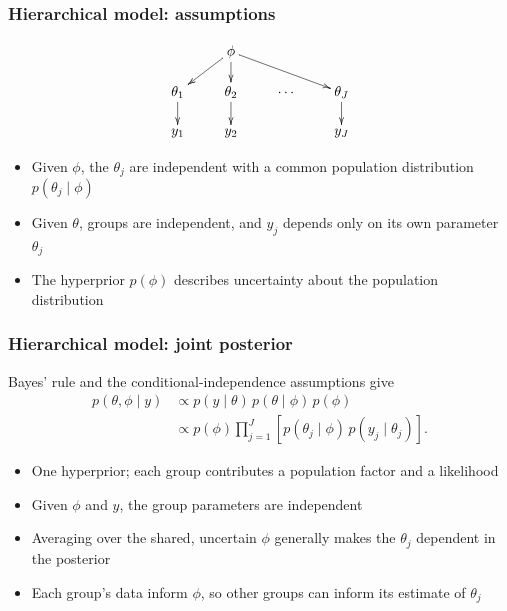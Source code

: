 \documentclass[10pt]{beamer}
\begin{document}
\begin{frame}
\frametitle{Hierarchical model: assumptions}

  \[
    \begin{xy}
      \xymatrix@R=5mm@C=8mm{
        & \phi \ar[dl] \ar[d] \ar[drr] & & \\
        \theta_1\ar[d] & \theta_2\ar[d] & \cdots & \theta_J\ar[d] \\
        y_1 & y_2 & & y_J
      }
    \end{xy}
  \]
  \begin{itemize}
  \item Given $\phi$, the $\theta_j$ are independent with a common
    population distribution $p(\theta_j\mid\phi)$
  \item<2-> Given $\theta$, groups are independent, and $y_j$
    depends only on its own parameter $\theta_j$
  \item<2-> The hyperprior $p(\phi)$ describes uncertainty about
    the population distribution
  \end{itemize}
\end{frame}

\begin{frame}
\frametitle{Hierarchical model: joint posterior}

  Bayes' rule and the conditional-independence assumptions give
  \begin{align*}
    p(\theta,\phi\mid y)
      &\propto p(y\mid\theta)\,p(\theta\mid\phi)\,p(\phi)\\
      &\propto p(\phi)\prod_{j=1}^J
        \left[p(\theta_j\mid\phi)\,p(y_j\mid\theta_j)\right].
  \end{align*}
  \begin{itemize}
  \item One hyperprior; each group contributes a population factor
    and a likelihood
  \item<2-> Given $\phi$ and $y$, the group parameters are independent
  \item<2-> Averaging over the shared, uncertain $\phi$ generally
    makes the $\theta_j$ dependent in the posterior
  \item<2-> Each group's data inform $\phi$, so other groups can
    inform its estimate of $\theta_j$
  \end{itemize}
\end{frame}
\end{document}
